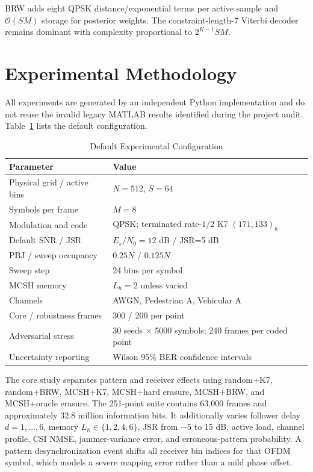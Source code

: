\documentclass[journal,10pt]{IEEEtran}
\begin{document}
BRW adds eight QPSK distance/exponential terms per active sample and
$\mathcal{O}(SM)$ storage for posterior weights. The constraint-length-7
Viterbi decoder remains dominant with complexity proportional to
$2^{K-1}SM$.

\section{Experimental Methodology}
All experiments are generated by an independent Python implementation and do
not reuse the invalid legacy MATLAB results identified during the project
audit. Table~\ref{tab:parameters} lists the default configuration.

\begin{table}[t]
\centering
\caption{Default Experimental Configuration}
\label{tab:parameters}
\scriptsize
\setlength{\tabcolsep}{3pt}
\begin{tabular}{p{2.6cm}p{5.0cm}}
\toprule
Parameter & Value \\
\midrule
Physical grid / active bins & $N=512$, $S=64$ \\
Symbols per frame & $M=8$ \\
Modulation and code & QPSK; terminated rate-$1/2$ K7 $(171,133)_8$ \\
Default SNR / JSR & $E_s/N_0=12$ dB / JSR=5 dB \\
PBJ / sweep occupancy & $0.25N$ / $0.125N$ \\
Sweep step & 24 bins per symbol \\
MCSH memory & $L_h=2$ unless varied \\
Channels & AWGN, Pedestrian A, Vehicular A \\
Core / robustness frames & 300 / 200 per point \\
Adversarial stress & 30 seeds $\times$ 5000 symbols; 240 frames per coded point \\
Uncertainty reporting & Wilson 95\% BER confidence intervals \\
\bottomrule
\end{tabular}
\end{table}

The core study separates pattern and receiver effects using random+K7,
random+BRW, MCSH+K7, MCSH+hard erasure, MCSH+BRW, and MCSH+oracle erasure.
The 251-point suite contains 63,000 frames and approximately 32.8 million
information bits. It additionally varies follower delay $d=1,\ldots,6$, memory
$L_h\in\{1,2,4,6\}$, JSR from $-5$ to 15 dB, active load, channel profile, CSI
NMSE, jammer-variance error, and erroneous-pattern probability. A pattern
desynchronization event shifts all receiver bin indices for that OFDM symbol,
which models a severe mapping error rather than a mild phase offset.
\end{document}
